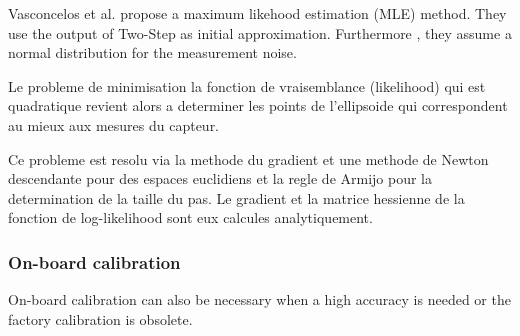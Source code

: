 Vasconcelos et al. \cite{MLE}  propose a maximum likehood estimation (MLE) method. They use the output of Two-Step \cite{Two-Step} as initial approximation. Furthermore , they assume a normal distribution for the measurement noise.

	Le probleme de minimisation  la fonction  de vraisemblance (likelihood) qui est quadratique revient alors a determiner les points de l'ellipsoide  qui correspondent au mieux aux mesures du capteur.

	Ce probleme est resolu via la methode du gradient et une methode de Newton descendante pour des espaces euclidiens \cite{Newton} et la regle de Armijo pour la determination de la taille du pas. Le gradient et la matrice hessienne de la fonction de log-likelihood sont eux calcules analytiquement. 

\subsubsection{On-board calibration}


On-board calibration can also be necessary when a high accuracy is needed or the factory calibration is obsolete.

